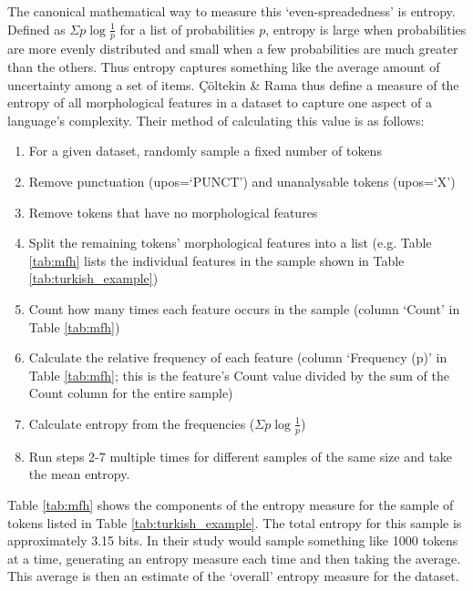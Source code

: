 \documentclass[USenglish]{article}
\begin{document}
The canonical mathematical way to measure this `even-spreadedness' is entropy.
Defined as $\Sigma p \log{\frac{1}{p}}$ for a list of probabilities $p$, entropy is large when probabilities are more evenly distributed and small when a few probabilities are much greater than the others.
Thus entropy captures something like the average amount of uncertainty among a set of items.
Çöltekin \& Rama thus define a measure of the entropy of all morphological features in a dataset to capture one aspect of a language's complexity.
Their method of calculating this value is as follows:
\begin{enumerate}
\item For a given dataset, randomly sample a fixed number of tokens
\item Remove punctuation (upos=`PUNCT') and unanalysable tokens (upos=`X')
\item Remove tokens that have no morphological features
\item Split the remaining tokens' morphological features into a list (e.g. Table \ref{tab:mfh} lists the individual features in the sample shown in Table \ref{tab:turkish_example})
\item Count how many times each feature occurs in the sample (column `Count' in Table \ref{tab:mfh})
\item Calculate the relative frequency of each feature (column `Frequency (p)' in Table \ref{tab:mfh}; this is the feature's Count value divided by the sum of the Count column for the entire sample)
\item Calculate entropy from the frequencies ($\Sigma p \log{\frac{1}{p}}$)
\item Run steps 2-7 multiple times for different samples of the same size and take the mean entropy.
\end{enumerate}

\noindent Table \ref{tab:mfh} shows the components of the entropy measure for the sample of tokens listed in Table \ref{tab:turkish_example}.
The total entropy for this sample is approximately 3.15 bits.
In their study \citet{ccoltekin2023complexity} would sample something like 1000 tokens at a time, generating an entropy measure each time and then taking the average.
This average is then an estimate of the `overall' entropy measure for the dataset.
\end{document}
